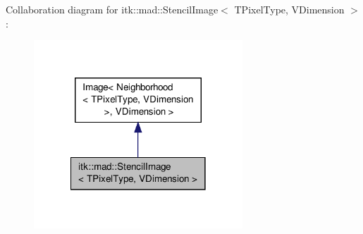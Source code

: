Collaboration diagram for itk\-:\-:mad\-:\-:Stencil\-Image$<$ T\-Pixel\-Type, V\-Dimension $>$\-:
\nopagebreak
\begin{figure}[H]
\begin{center}
\leavevmode
\includegraphics[width=222pt]{classitk_1_1mad_1_1_stencil_image__coll__graph}
\end{center}
\end{figure}
